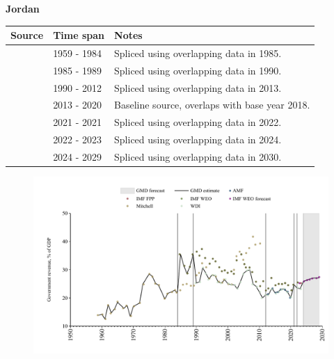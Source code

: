 \documentclass[12pt,a4paper,landscape]{article}
\begin{document}
\begin{adjustbox}{max totalsize={\paperwidth}{\paperheight},center}
\begin{minipage}[t][\textheight][t]{\textwidth}
\vspace*{0.5cm}
{}
\begin{center}
{\Large\bfseries Jordan}
\end{center}
\vspace{0.5cm}
\begin{table}[H]
\centering
\small
\begin{tabular}{|l|l|l|}
\hline
\textbf{Source} & \textbf{Time span} & \textbf{Notes} \\
\hline
\rowcolor{white}\cite{Mitchell}& 1959 - 1984 &Spliced using overlapping data in 1985.\\
\rowcolor{lightgray}\cite{IMF_WEO}& 1985 - 1989 &Spliced using overlapping data in 1990.\\
\rowcolor{white}\cite{WDI}& 1990 - 2012 &Spliced using overlapping data in 2013.\\
\rowcolor{lightgray}\cite{AMF}& 2013 - 2020 &Baseline source, overlaps with base year 2018.\\
\rowcolor{white}\cite{IMF_WEO}& 2021 - 2021 &Spliced using overlapping data in 2022.\\
\rowcolor{lightgray}\cite{WDI}& 2022 - 2023 &Spliced using overlapping data in 2024.\\
\rowcolor{white}\cite{IMF_WEO_forecast}& 2024 - 2029 &Spliced using overlapping data in 2030.\\
\hline
\end{tabular}
\end{table}
\begin{figure}[H]
\centering
\includegraphics[width=\textwidth,height=0.6\textheight,keepaspectratio]{graphs/JOR_govrev_GDP.pdf}
\end{figure}
\end{minipage}
\end{adjustbox}
\end{document}
